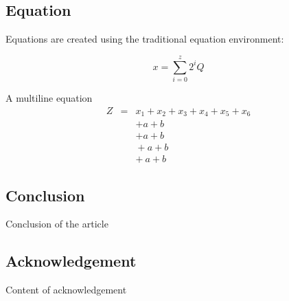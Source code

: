 \documentclass[twoside]{CUGCSthesis_EN}
\begin{document}
	\subsection{Equation}

	Equations are created using the traditional equation environment:

	\begin{equation}
		\label{eqn_example}
		x = \sum\limits_{i=0}^{z} 2^{i}Q
	\end{equation}

	A multiline equation
	\begin{eqnarray}
		Z&{}={}&x_1 + x_2 + x_3 + x_4 + x_5 + x_6\nonumber\\
		&&+a + b\\
		&&+{}a + b\\
		&&{}+a + b\\
		&&{+}\:a + b
	\end{eqnarray}
	
	\begin{spacing}{2}
		\section{Conclusion}
	\end{spacing}
	
	Conclusion of the article
	
	\begin{spacing}{2}
		\section*{Acknowledgement}
	\end{spacing}
	
	Content of acknowledgement
	
	\clearpage
	
	
	
\end{document}
